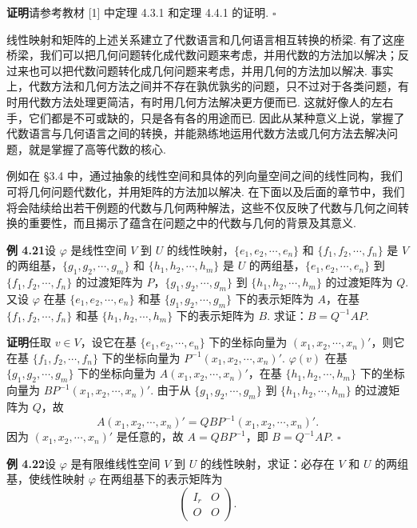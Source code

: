 \documentclass[UTF8,12pt,a4paper,fontset=fandol]{ctexart}
\begin{document}
\noindent\textbf{证明}\quad 请参考教材 [1] 中定理 4.3.1 和定理 4.4.1 的证明. $\square$

线性映射和矩阵的上述关系建立了代数语言和几何语言相互转换的桥梁. 有了这座桥梁，我们可以把几何问题转化成代数问题来考虑，并用代数的方法加以解决；反过来也可以把代数问题转化成几何问题来考虑，并用几何的方法加以解决. 事实上，代数方法和几何方法之间并不存在孰优孰劣的问题，只不过对于各类问题，有时用代数方法处理更简洁，有时用几何方法解决更方便而已. 这就好像人的左右手，它们都是不可或缺的，只是各有各的用途而已. 因此从某种意义上说，掌握了代数语言与几何语言之间的转换，并能熟练地运用代数方法或几何方法去解决问题，就是掌握了高等代数的核心.

例如在 §3.4 中，通过抽象的线性空间和具体的列向量空间之间的线性同构，我们可将几何问题代数化，并用矩阵的方法加以解决. 在下面以及后面的章节中，我们将会陆续给出若干例题的代数与几何两种解法，这些不仅反映了代数与几何之间转换的重要性，而且揭示了蕴含在问题之中的代数与几何的背景及其意义.

\noindent\textbf{例 4.21}\quad 设 $\varphi$ 是线性空间 $V$ 到 $U$ 的线性映射，$\{e_1,e_2,\cdots,e_n\}$ 和 $\{f_1,f_2,\cdots,f_n\}$ 是 $V$ 的两组基，$\{g_1,g_2,\cdots,g_m\}$ 和 $\{h_1,h_2,\cdots,h_m\}$ 是 $U$ 的两组基，$\{e_1,e_2,\cdots,e_n\}$ 到 $\{f_1,f_2,\cdots,f_n\}$ 的过渡矩阵为 $P$，$\{g_1,g_2,\cdots,g_m\}$ 到 $\{h_1,h_2,\cdots,h_m\}$ 的过渡矩阵为 $Q$. 又设 $\varphi$ 在基 $\{e_1,e_2,\cdots,e_n\}$ 和基 $\{g_1,g_2,\cdots,g_m\}$ 下的表示矩阵为 $A$，在基 $\{f_1,f_2,\cdots,f_n\}$ 和基 $\{h_1,h_2,\cdots,h_m\}$ 下的表示矩阵为 $B$. 求证：$B=Q^{-1}AP$.

\noindent\textbf{证明}\quad 任取 $v\in V$，设它在基 $\{e_1,e_2,\cdots,e_n\}$ 下的坐标向量为 $(x_1,x_2,\cdots,x_n)'$，则它在基 $\{f_1,f_2,\cdots,f_n\}$ 下的坐标向量为 $P^{-1}(x_1,x_2,\cdots,x_n)'$. $\varphi(v)$ 在基 $\{g_1,g_2,\cdots,g_m\}$ 下的坐标向量为 $A(x_1,x_2,\cdots,x_n)'$，在基 $\{h_1,h_2,\cdots,h_m\}$ 下的坐标向量为 $BP^{-1}(x_1,x_2,\cdots,x_n)'$. 由于从 $\{g_1,g_2,\cdots,g_m\}$ 到 $\{h_1,h_2,\cdots,h_m\}$ 的过渡矩阵为 $Q$，故
\[
A(x_1,x_2,\cdots,x_n)'=QBP^{-1}(x_1,x_2,\cdots,x_n)'.
\]
因为 $(x_1,x_2,\cdots,x_n)'$ 是任意的，故 $A=QBP^{-1}$，即 $B=Q^{-1}AP$. $\square$

\noindent\textbf{例 4.22}\quad 设 $\varphi$ 是有限维线性空间 $V$ 到 $U$ 的线性映射，求证：必存在 $V$ 和 $U$ 的两组基，使线性映射 $\varphi$ 在两组基下的表示矩阵为
\[
\left(\begin{array}{cc}
I_r & O\\
O & O
\end{array}\right).
\]
\end{document}
